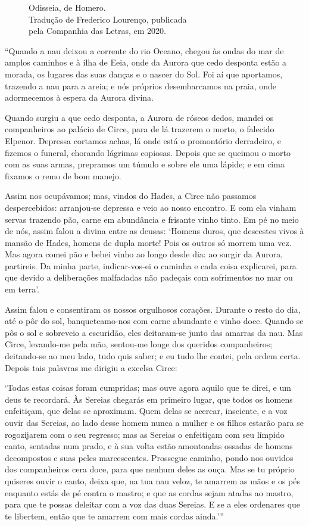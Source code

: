 \begin{coverpages}
{\begin{figure}
\begin{center}
\footnotesize{Odisseia, de Homero.\\
Tradução de Frederico Lourenço, publicada\\
pela Companhia das Letras, em 2020.}
\vspace{-0.3cm}
\end{center}
\end{figure}
``Quando a nau deixou a corrente do rio Oceano, chegou às ondas do mar de amplos
caminhos e à ilha de Eeia, onde da Aurora que cedo desponta estão a morada, os
lugares das suas danças e o nascer do Sol. Foi aí que aportamos, trazendo a nau
para a areia; e nós próprios desembarcamos na praia, onde adormecemos à espera
da Aurora divina.

Quando surgiu a que cedo desponta, a Aurora de róseos dedos, mandei os
companheiros ao palácio de Circe, para de lá trazerem o morto, o falecido
Elpenor. Depressa cortamos achas, lá onde está o promontório derradeiro, e
fizemos o funeral, chorando lágrimas copiosas. Depois que se queimou o morto com
as suas armas, prepramos um túmulo e sobre ele uma lápide; e em cima fixamos o
remo de bom manejo.

Assim nos ocupávamos; mas, vindos do Hades, a Circe não passamos despercebidos:
arranjou-se depressa e veio ao nosso encontro. E com ela vinham  servas trazendo
pão, carne em abundância e frisante vinho tinto. Em pé no meio de nós, assim
falou a divina entre as deusas: `Homens duros, que descestes vivos à mansão de
Hades, homens de dupla morte! Pois os outros só morrem uma vez. Mas agora comei
pão e bebei vinho ao longo desde dia: ao surgir da Aurora, partireis. Da minha
parte, indicar-vos-ei o caminha e cada coisa explicarei, para que devido a
deliberações malfadadas não padeçais com sofrimentos no mar ou em terra'.

Assim falou e consentiram os nossos orgulhosos corações. Durante o resto do dia,
até o pôr do sol, banqueteamo-nos com carne abundante e vinho doce. Quando se
pôs o sol e sobreveio a escuridão, eles deitaram-se junto das amarras da
nau. Mas Circe, levando-me pela mão, sentou-me longe dos queridos companheiros;
deitando-se ao meu lado, tudo quis saber; e eu tudo lhe contei, pela ordem
certa. Depois tais palavras me dirigiu a excelsa Circe:

`Todas estas coisas foram cumpridas; mas ouve agora aquilo que te direi, e um
deus te recordará. Às Sereias chegarás em primeiro lugar, que todos os homens
enfeitiçam, que delas se aproximam. Quem delas se acercar, insciente, e a voz
ouvir das Sereias, ao lado desse homem nunca a mulher e os filhos estarão para
se rogozijarem com o seu regresso; mas as Sereias o enfeitiçam com seu límpido
canto, sentadas num prado, e à sua volta estão amontoadas ossadas de homens
decompostos e suas peles marcescentes. Prossegue caminho, pondo nos ouvidos dos
companheiros cera doce, para que nenhum deles as ouça. Mas se tu próprio
quiseres ouvir o canto, deixa que, na tua nau veloz, te amarrem as mãos e os pés
enquanto estás de pé contra o mastro; e que as cordas sejam atadas ao mastro,
para que te possas deleitar com a voz das duas Sereias. E se a eles ordenares
que te libertem, então que te amarrem com mais cordas ainda.'{''}}


\end{coverpages}
